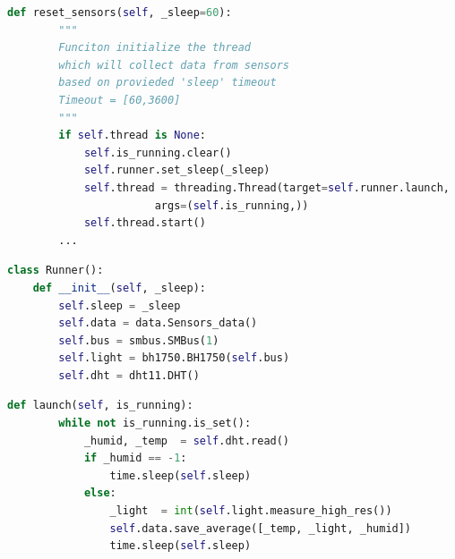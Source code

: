 \begin{lstlisting}[frame=single, basicstyle=\ttfamily\small, language=python,
caption={Inicjalizacja procesu zbierającego dane}]
def reset_sensors(self, _sleep=60):
        """
        Funciton initialize the thread
        which will collect data from sensors
        based on provieded 'sleep' timeout
        Timeout = [60,3600]
        """
        if self.thread is None:
            self.is_running.clear()
            self.runner.set_sleep(_sleep)
            self.thread = threading.Thread(target=self.runner.launch,
					   args=(self.is_running,))
            self.thread.start()
	    ...
\end{lstlisting}
\begin{lstlisting}[frame=single, basicstyle=\ttfamily\small, language=python,
caption={Definicja procesu zbierającego dane}]
class Runner():
    def __init__(self, _sleep):
        self.sleep = _sleep
        self.data = data.Sensors_data()
        self.bus = smbus.SMBus(1)
        self.light = bh1750.BH1750(self.bus)
        self.dht = dht11.DHT()
\end{lstlisting}
\begin{lstlisting}[frame=single, basicstyle=\ttfamily\small, language=python,
caption={Zbiór i zapis danych}]
 def launch(self, is_running):
        while not is_running.is_set():
            _humid, _temp  = self.dht.read()
            if _humid == -1:
                time.sleep(self.sleep)
            else:
                _light  = int(self.light.measure_high_res())
                self.data.save_average([_temp, _light, _humid])
                time.sleep(self.sleep)
\end{lstlisting}
